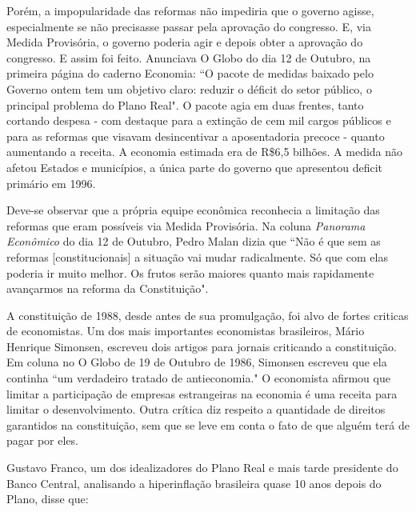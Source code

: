 \documentclass{article}
\begin{document}
Porém, a impopularidade das reformas não impediria que o governo agisse, especialmente se não precisasse passar pela aprovação do congresso. E, via Medida Provisória, o governo poderia agir e depois obter a aprovação do congresso. E assim foi feito. Anunciava O Globo do dia 12 de Outubro, na primeira página do caderno Economia: ``O pacote de medidas baixado pelo Governo ontem tem um objetivo claro: reduzir o déficit do setor público, o principal problema do Plano Real". O pacote agia em duas frentes, tanto cortando despesa - com destaque para a extinção de cem mil cargos públicos e para as reformas que visavam desincentivar a aposentadoria precoce - quanto aumentando a receita. A economia estimada era de R\$6,5 bilhões. A medida não afetou Estados e municípios, a única parte do governo que apresentou deficit primário em 1996.


Deve-se observar que a própria equipe econômica reconhecia a limitação das reformas que eram possíveis via Medida Provisória. Na coluna \textit{Panorama Econômico} do dia 12 de Outubro, Pedro Malan dizia que ``Não é que sem as reformas [constitucionais] a situação vai mudar radicalmente. Só que com elas poderia ir muito melhor. Os frutos serão maiores quanto mais rapidamente avançarmos na reforma da Constituição". 

A constituição de 1988, desde antes de sua promulgação, foi alvo de fortes criticas de economistas. Um dos mais importantes economistas brasileiros, Mário Henrique Simonsen, escreveu dois artigos para jornais criticando a constituição. Em coluna no O Globo de 19 de Outubro de 1986, Simonsen escreveu que ela continha ``um verdadeiro tratado de antieconomia." O economista afirmou que limitar a participação de empresas estrangeiras na economia é uma receita para limitar o desenvolvimento. Outra crítica diz respeito a quantidade de direitos garantidos na constituição, sem que se leve em conta o fato de que alguém terá de pagar por eles.

Gustavo Franco, um dos idealizadores do Plano Real e mais tarde presidente do Banco Central, analisando a hiperinflação brasileira quase 10 anos depois do Plano, disse que:
\end{document}
